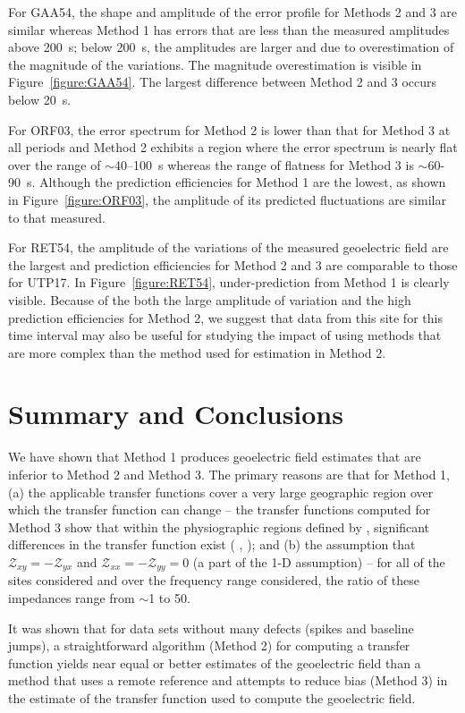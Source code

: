\documentclass[linenumbers,draft]{agujournal}
\newcommand{\citeay}[1]{%
\citeauthor{#1}, \citeyear{#1}%
}
\begin{document}
For GAA54, the shape and amplitude of the error profile for Methods 2 and 3 are similar whereas Method 1 has errors that are less than the measured amplitudes above 200~s; below 200~s, the amplitudes are larger and due to overestimation of the magnitude of the variations.  The magnitude overestimation is visible in Figure~\ref{figure:GAA54}.  The largest difference between Method 2 and 3 occurs below 20~s.

For ORF03, the error spectrum for Method 2 is lower than that for Method 3 at all periods and Method 2 exhibits a region where the error spectrum is nearly flat over the range of $\sim$40--100~s whereas the range of flatness for Method 3 is $\sim$60-90~s.  Although the prediction efficiencies for Method 1 are the lowest, as shown in Figure~\ref{figure:ORF03}, the amplitude of its predicted fluctuations are similar to that measured.

For RET54, the amplitude of the variations of the measured geoelectric field are the largest and prediction efficiencies for Method 2 and 3 are comparable to those for UTP17.  In Figure~\ref{figure:RET54}, under-prediction from Method 1 is clearly visible.  Because of the both the large amplitude of variation and the high prediction efficiencies for Method 2, we suggest that data from this site for this time interval may also be useful for studying the impact of using methods that are more complex than the method used for estimation in Method 2.

\section{Summary and Conclusions}

We have shown that Method 1 produces geoelectric field estimates that are inferior to Method 2 and Method 3.  The primary reasons are that for Method 1, (a) the applicable transfer functions cover a very large geographic region over which the transfer function can change -- the transfer functions computed for Method 3 show that within the physiographic regions defined by \cite{Fernberg2012}, significant differences in the transfer function exist (\citeay{Bedrosian2015}); and (b) the assumption that $\mathcal{Z}_{xy}=-\mathcal{Z}_{yx}$ and $\mathcal{Z}_{xx}=-\mathcal{Z}_{yy} = 0$ (a part of the 1-D assumption) -- for all of the sites considered and over the frequency range considered, the ratio of these impedances range from $\sim$1 to 50.

It was shown that for data sets without many defects (spikes and baseline jumps), a straightforward algorithm (Method 2) for computing a transfer function yields near equal or better estimates of the geoelectric field than a method that uses a remote reference and attempts to reduce bias (Method 3) in the estimate of the transfer function used to compute the geoelectric field.
\end{document}
